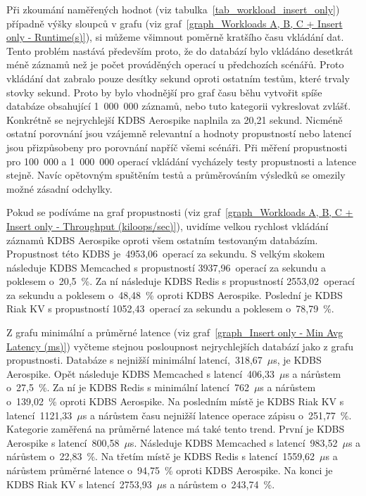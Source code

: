 \documentclass[czech,master,dept460,male,csharp,cpdeclaration]{diploma}
\begin{document}
	Při zkoumání naměřených hodnot (viz tabulka~\ref{tab_workload_insert_only}) případně výšky sloupců v grafu (viz graf~\ref{graph_Workloads A, B, C + Insert only - Runtime(s)}), si můžeme všimnout poměrně kratšího času vkládání dat. Tento problém nastává především proto, že do databází bylo vkládáno desetkrát méně záznamů než je počet prováděných operací u předchozích scénářů. Proto vkládání dat zabralo pouze desítky sekund oproti ostatním testům, které trvaly stovky sekund. Proto by bylo vhodnější pro graf času běhu vytvořit spíše databáze obsahující 1~000~000 záznamů, nebo tuto kategorii vykreslovat zvlášť. Konkrétně se nejrychlejší KDBS Aerospike naplnila za 20,21 sekund. Nicméně ostatní porovnání jsou vzájemně relevantní a hodnoty propustností nebo latencí jsou přizpůsobeny pro porovnání napříč všemi scénáři. Při měření propustnosti pro 100~000 a 1~000~000 operací vkládání vycházely testy propustnosti a latence stejně. Navíc opětovným spuštěním testů a průměrováním výsledků se omezily možné zásadní odchylky.
	
	Pokud se podíváme na graf propustnosti (viz graf~\ref{graph_Workloads A, B, C + Insert only - Throughput (kiloops/sec)}), uvidíme velkou rychlost vkládání záznamů KDBS Aerospike oproti všem ostatním testovaným databázím. Propustnost této KDBS je~4953,06~operací za sekundu. S velkým skokem následuje KDBS Memcached s propustností 3937,96~operací za sekundu a poklesem o~20,5~\%. Za ní následuje KDBS Redis s propustností 2553,02~operací za sekundu a poklesem o~48,48~\% oproti KDBS Aerospike. Poslední je KDBS Riak KV s propustností 1052,43~operací za sekundu a poklesem o~78,79~\%.
	
	Z grafu minimální a průměrné latence (viz graf~\ref{graph_Insert only - Min Avg Latency (ms)}) vyčteme stejnou posloupnost nejrychlejších databází jako z grafu propustnosti. Databáze s nejnižší minimální latencí,~318,67~$\mu$s, je KDBS Aerospike. Opět následuje KDBS Memcached s latencí~406,33~$\mu$s a nárůstem o~27,5~\%. Za ní je KDBS Redis s minimální latencí~762~$\mu$s a nárůstem o~139,02~\% oproti KDBS Aerospike. Na posledním místě je KDBS Riak KV s latencí~1121,33~$\mu$s a nárůstem času nejnižší latence operace zápisu o~251,77~\%. Kategorie zaměřená na průměrné latence má také tento trend. První je KDBS Aerospike s latencí~800,58~$\mu$s. Následuje KDBS Memcached s latencí~983,52~$\mu$s a nárůstem o~22,83~\%. Na třetím místě je KDBS Redis s latencí~1559,62~$\mu$s a nárůstem průměrné latence o~94,75~\% oproti KDBS Aerospike. Na konci je KDBS Riak KV s latencí~2753,93~$\mu$s a nárůstem o~243,74~\%.
	
\end{document}
